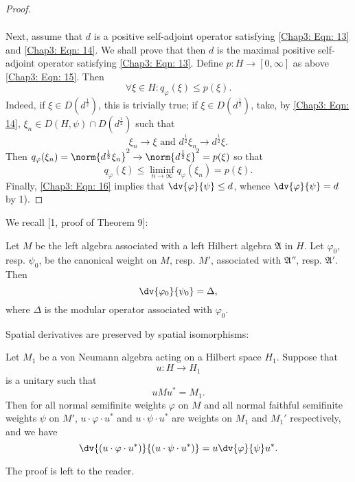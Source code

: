 \begin{proof}
\[\begin{split}
        \end{split}
    \]\par
    Next, assume that $d$ is a positive self-adjoint operator satisfying \eqref{Chap3: Eqn: 13} and \eqref{Chap3: Eqn: 14}. We shall prove that then $d$ is the maximal positive self-adjoint operator satisfying \eqref{Chap3: Eqn: 13}. Define $p:H \to [0,\infty]$ as above \eqref{Chap3: Eqn: 15}. Then
    \begin{equation}\label{Chap3: Eqn: 16}
        \forall \xi\in H:q_\varphi(\xi)\leq p(\xi).
    \end{equation}
    Indeed, if $\xi\in D(d^\frac{1}{2})$, this is trivially true; if $\xi\in D(d^\frac{1}{2})$, take, by \eqref{Chap3: Eqn: 14}, $\xi_n\in D(H,\psi)\cap D(d^\frac{1}{2})$ such that
    \[
        \xi_n\to \xi\text{ and }d^\frac{1}{2}\xi_n\to d^\frac{1}{2}\xi.
    \]
    Then $q_\varphi(\xi_n)=\norm{d^\frac{1}{2}\xi_n}^2\to \norm{d^\frac{1}{2}\xi}^2=p(\xi)$ so that
    \[
        q_\varphi(\xi)\leq \liminf_{n\to \infty}q_\varphi(\xi_n)=p(\xi).
    \]
    Finally, \eqref{Chap3: Eqn: 16} implies that $\dv{\varphi}{\psi}\leq d$, whence $\dv{\varphi}{\psi}=d$ by 1).
\end{proof}
We recall [1, proof of Theorem 9]:
\begin{example}\label{Chap3: Eg: 23}
    Let $M$ be the left algebra associated with a left Hilbert algebra $\mathfrak{A}$ in $H$. Let $\varphi_0$, resp. $\psi_0$, be the canonical weight on $M$, resp. $M'$, associated with $\mathfrak{A}''$, resp. $\mathfrak{A}'$. Then
    \[
        \dv{\varphi_0}{\psi_0}=\Delta,
    \]
    where $\Delta$ is the modular operator associated with $\varphi_0$.
\end{example}
Spatial derivatives are preserved by spatial isomorphisms:
\begin{proposition}\label{Chap3: Prop: 24}
    Let $M_1$ be a von Neumann algebra acting on a Hilbert space $H_1$. Suppose that
    \[
        u:H\to H_1
    \]
    is a unitary such that
    \[
        uMu^*=M_1.
    \]
    Then for all normal semifinite weights $\varphi$ on $M$ and all normal faithful semifinite weights $\psi$ on $M'$, $u\cdot\varphi\cdot u^*$ and $u\cdot\psi\cdot u^*$ are weights on $M_1$ and $M_1'$ respectively, and we have
    \[
        \dv{(u\cdot\varphi\cdot u^*)}{(u\cdot\psi\cdot u^*)}=u\dv{\varphi}{\psi}u^*.
    \]
\end{proposition}
The proof is left to the reader.
